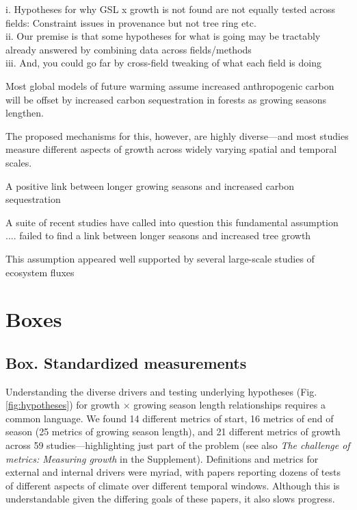 \documentclass[11pt]{article}
\begin{document}
i. Hypotheses for why GSL x growth is not found are not equally tested across fields: Constraint issues in provenance but not tree ring etc.\\
ii. Our premise is that some hypotheses for what is going may be tractably already answered by combining data across fields/methods\\
iii. And, you could go far by cross-field tweaking of what each field is doing

Most global models of future warming assume increased anthropogenic carbon will be offset by increased carbon sequestration in forests as growing seasons lengthen.

The proposed mechanisms for this, however, are highly diverse---and most studies measure different aspects of growth across widely varying spatial and temporal scales. 

A positive link between longer growing seasons and increased carbon sequestration 

A suite of recent studies have called into question this fundamental assumption .... failed to find a link between longer seasons and increased tree growth

This assumption appeared well supported by several large-scale studies of ecosystem fluxes 
\fi


\newpage
\section{Boxes}
\subsection*{Box. Standardized measurements} %

Understanding the diverse drivers and testing underlying hypotheses (Fig. \ref{fig:hypotheses}) for growth $\times$ growing season length relationships requires a common language. We found 14 different metrics of start, 16 metrics of end of season (25 metrics of growing season length), and 21 different metrics of growth across 59 studies---highlighting just part of the problem (see also \emph{The challenge of metrics: Measuring growth} in the Supplement). Definitions and metrics for external and internal drivers were myriad, %
with papers reporting dozens of tests of different aspects of climate over different temporal windows. Although this is understandable given the differing goals of these papers, it also slows progress. 
\end{document}
